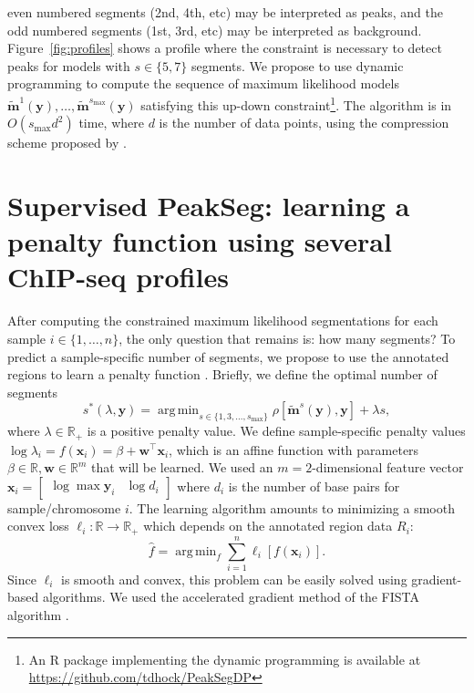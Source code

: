 \documentclass{article}
\DeclareMathOperator*{\argmin}{arg\,min}
\newcommand{\RR}{\mathbb R}
\begin{document}
even numbered segments (2nd, 4th, etc) may be interpreted as peaks,
and the odd numbered segments (1st, 3rd, etc) may be interpreted as
background. Figure~\ref{fig:profiles} shows a profile where the
constraint is necessary to detect peaks for models with $s\in\{5, 7\}$
segments. We propose to use dynamic programming to compute the
sequence of maximum likelihood models $\mathbf{\tilde m}^1(\mathbf y),
\dots, \mathbf{\tilde m}^{s_{\text{max}}}(\mathbf y)$ satisfying this
up-down constraint\footnote{An R package implementing the 
  dynamic programming is available at
  \url{https://github.com/tdhock/PeakSegDP}}. The algorithm is in
$O(s_{\text{max}} d^2)$ time, where $d$ is the number of data points,
using the compression scheme proposed by \citet{Segmentor}.

\section{Supervised PeakSeg: learning a penalty function using several ChIP-seq profiles}
\label{sec:supervised}

After computing the constrained maximum likelihood segmentations for
each sample $i\in\{1,\dots, n\}$, the only question that remains is:
how many segments? To predict a sample-specific number of segments, we
propose to use the annotated regions to learn a penalty function
\citep{HOCKING-penalties}. Briefly, we define the optimal number of
segments 
\begin{equation}
  s^*(\lambda, \mathbf y) = 
  \argmin_{s\in\{1,3,\dots, s_{\text{max}}\}}
  \rho\left[
    \mathbf{\tilde m}^s(\mathbf y),
    \mathbf y
  \right]
  + \lambda s,
\end{equation}
where $\lambda\in\RR_+$ is a positive
penalty value. We define sample-specific penalty values $\log
\lambda_i = f(\mathbf x_i) = \beta + \mathbf w^\intercal \mathbf x_i$,
which is an affine function with parameters $\beta\in\RR,\mathbf
w\in\RR^m$ that will be learned. We used an $m=2$-dimensional feature vector
$\mathbf x_i = \left[\begin{array}{cc} \log\max \mathbf y_i & \log d_i
\end{array}\right]$ where $d_i$ is the number of base pairs for 
sample/chromosome $i$. The learning algorithm amounts to minimizing a
smooth convex loss $\ell_i:\RR\rightarrow\RR_+$ which depends on the
annotated region data $R_i$:
\begin{equation}
  \label{eq:relax}
  \hat f = \argmin_f \sum_{i=1}^n
  \ell_i\left[ f(\mathbf x_i) \right].
\end{equation}
Since $\ell_i$ is smooth and convex, this problem can be easily solved
using gradient-based algorithms. We used the accelerated gradient
method of the FISTA algorithm \citep{fista}.
\end{document}
